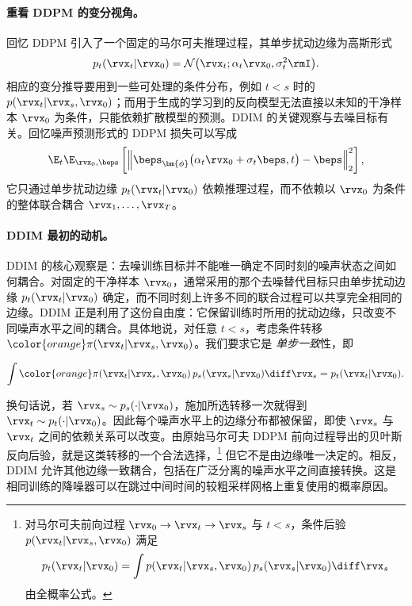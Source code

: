 \paragraph{重看 DDPM 的变分视角。}
回忆 DDPM 引入了一个固定的马尔可夫推理过程，其单步扰动边缘为高斯形式
\[
p_t(\rvx_t|\rvx_0)
=
\mathcal N
\bigl(
\rvx_t;
\alpha_t\rvx_0,
\sigma_t^2\rmI
\bigr).
\]
相应的变分推导要用到一些可处理的条件分布，例如 $t<s$ 时的 $p(\rvx_t|\rvx_s,\rvx_0)$；而用于生成的学习到的反向模型无法直接以未知的干净样本 $\rvx_0$ 为条件，只能依赖扩散模型的预测。DDIM 的关键观察与去噪目标有关。回忆噪声预测形式的 DDPM 损失可以写成
\[
\E_t
\E_{\rvx_0,\beps}
\left[
\left\|
\beps_{\bm{\phi}}
\bigl(
\alpha_t\rvx_0+\sigma_t\beps,t
\bigr)
-
\beps
\right\|_2^2
\right],
\]
它只通过单步扰动边缘 $p_t(\rvx_t|\rvx_0)$ 依赖推理过程，而不依赖以 $\rvx_0$ 为条件的整体联合耦合 $\rvx_1,\ldots,\rvx_T$。


\paragraph{DDIM 最初的动机。}
DDIM 的核心观察是：去噪训练目标并不能唯一确定不同时刻的噪声状态之间如何耦合。对固定的干净样本 $\rvx_0$，通常采用的那个去噪替代目标只由单步扰动边缘 $p_t(\rvx_t|\rvx_0)$ 确定，而不同时刻上许多不同的联合过程可以共享完全相同的边缘。DDIM 正是利用了这份自由度：它保留训练时所用的扰动边缘，只改变不同噪声水平之间的耦合。具体地说，对任意 $t<s$，考虑条件转移
${\color{orange}\pi(\rvx_t|\rvx_s,\rvx_0)}$。我们要求它是
\emph{单步一致}性，即
\begin{mdframed}
\begin{align}
\label{eq:ddim-reverse-kernel-def}
\int
{\color{orange}\pi(\rvx_t|\rvx_s,\rvx_0)}
\,p_s(\rvx_s|\rvx_0)
\diff\rvx_s
=
p_t(\rvx_t|\rvx_0).
\end{align}
\end{mdframed}
换句话说，若 $\rvx_s\sim p_s(\cdot|\rvx_0)$，施加所选转移一次就得到 $\rvx_t\sim p_t(\cdot|\rvx_0)$。因此每个噪声水平上的边缘分布都被保留，即使 $\rvx_s$ 与 $\rvx_t$ 之间的依赖关系可以改变。由原始马尔可夫 DDPM 前向过程导出的贝叶斯反向后验，就是这类转移的一个合法选择，\footnote{对马尔可夫前向过程
$\rvx_0\to\rvx_t\to\rvx_s$ 与 $t<s$，条件后验
$p(\rvx_t|\rvx_s,\rvx_0)$ 满足
\[
p_t(\rvx_t|\rvx_0)
=
\int
p(\rvx_t|\rvx_s,\rvx_0)
\,p_s(\rvx_s|\rvx_0)
\diff\rvx_s
\]
由全概率公式。}
但它不是由边缘唯一决定的。相反，DDIM 允许其他边缘一致耦合，包括在广泛分离的噪声水平之间直接转换。这是相同训练的降噪器可以在跳过中间时间的较粗采样网格上重复使用的概率原因。

